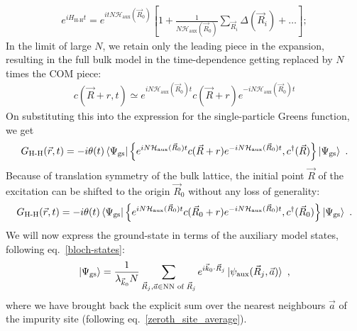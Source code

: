 \documentclass{report}
\numberwithin{equation}{section}
\begin{document}
\begin{equation}\begin{aligned}
	e^{i H_\text{H-H} t} = e^{i t N \mathcal{H}_\text{aux}(\vec R_0)}\left[1 + \frac{1}{N \mathcal{H}_\text{aux}(\vec R_0)}\sum_{\vec R_i} \Delta(\vec R_i) + \ldots\right];
\end{aligned}\end{equation}
In the limit of large \(N\), we retain only the leading piece in the expansion, resulting in the full bulk model in the time-dependence getting replaced by \(N\) times the COM piece:
\begin{equation}\begin{aligned}
	c(\vec R + r,t) \simeq e^{i N \mathcal{H}_\text{aux}(\vec R_0) t}c(\vec R + r)e^{-i N \mathcal{H}_\text{aux}(\vec R_0) t}
\end{aligned}\end{equation}
On substituting this into the expression for the single-particle Greens function, we get
\begin{equation}\begin{aligned}
	G_\text{H-H}(\vec r, t) = -i\theta(t) \braket{\Psi_\text{gs} | \left\{ e^{i N \mathcal{H}_\text{aux}(\vec R_0) t}c(\vec R + r)e^{-i N \mathcal{H}_\text{aux}(\vec R_0) t}, c^\dagger(\vec R) \right\} | \Psi_\text{gs}}~.
\end{aligned}\end{equation}
Because of translation symmetry of the bulk lattice, the initial point \(\vec R\) of the excitation can be shifted to the origin \(\vec R_0\) without any loss of generality:
\begin{equation}\begin{aligned}
	G_\text{H-H}(\vec r, t) = -i\theta(t) \braket{\Psi_\text{gs} | \left\{ e^{i N \mathcal{H}_\text{aux}(\vec R_0) t}c(\vec R_0 + r)e^{-i N \mathcal{H}_\text{aux}(\vec R_0) t}, c^\dagger(\vec R_0) \right\} | \Psi_\text{gs}}~.
\end{aligned}\end{equation}
We will now express the ground-state in terms of the auxiliary model states, following eq.~\ref{bloch-states}:
\begin{equation}\begin{aligned}
	\ket{\Psi_\text{gs}} = \frac{1}{\lambda_{\vec k_0} N}\sum_{\vec R_j, \vec a \in \text{NN of }\vec R_j} e^{i \vec{k}_0\cdot\vec{R}_j} \ket{\psi_\text{aux}(\vec R_j, \vec a)}~,
\end{aligned}\end{equation}
where we have brought back the explicit sum over the nearest neighbours \(\vec a\) of the impurity site (following eq.~\ref{zeroth_site_average}).
\end{document}
